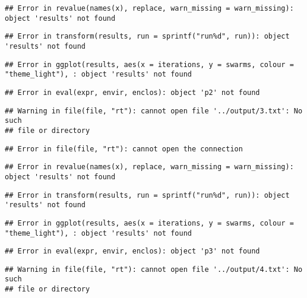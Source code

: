 \documentclass[12pt,a4paper]{article}
\begin{document}
\begin{verbatim}
## Error in revalue(names(x), replace, warn_missing = warn_missing): object 'results' not found
\end{verbatim}

\begin{verbatim}
## Error in transform(results, run = sprintf("run%d", run)): object 'results' not found
\end{verbatim}

\begin{verbatim}
## Error in ggplot(results, aes(x = iterations, y = swarms, colour = "theme_light"), : object 'results' not found
\end{verbatim}

\begin{verbatim}
## Error in eval(expr, envir, enclos): object 'p2' not found
\end{verbatim}

\begin{verbatim}
## Warning in file(file, "rt"): cannot open file '../output/3.txt': No such
## file or directory
\end{verbatim}

\begin{verbatim}
## Error in file(file, "rt"): cannot open the connection
\end{verbatim}

\begin{verbatim}
## Error in revalue(names(x), replace, warn_missing = warn_missing): object 'results' not found
\end{verbatim}

\begin{verbatim}
## Error in transform(results, run = sprintf("run%d", run)): object 'results' not found
\end{verbatim}

\begin{verbatim}
## Error in ggplot(results, aes(x = iterations, y = swarms, colour = "theme_light"), : object 'results' not found
\end{verbatim}

\begin{verbatim}
## Error in eval(expr, envir, enclos): object 'p3' not found
\end{verbatim}

\begin{verbatim}
## Warning in file(file, "rt"): cannot open file '../output/4.txt': No such
## file or directory
\end{verbatim}
\end{document}
